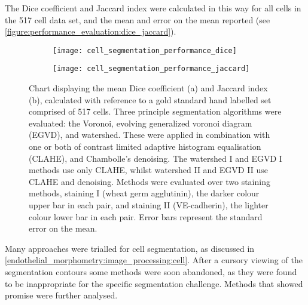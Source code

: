 The Dice coefficient and Jaccard index were calculated in this way for all cells in the 517 cell data set, and the mean and error on the mean reported (see \autoref{figure:performance_evaluation:dice_jaccard}).
\begin{figure}[htbp!]
	\begin{subfigure}[b]{\linewidth}
		\centering
		\texttt{[image: cell\_segmentation\_performance\_dice]}
		\caption{}
		\label{figure:performance_evaluation:dice_jaccard:dice}
		\vspace{1ex}
	\end{subfigure}
	\begin{subfigure}[b]{\linewidth}
		\centering
		\texttt{[image: cell\_segmentation\_performance\_jaccard]}
		\caption{}
		\label{figure:performance_evaluation:dice_jaccard:jaccard}
		\vspace{1ex}
	\end{subfigure}
\caption[Cell segmentation overlap ratio measures - Dice and Jaccard]{Chart displaying the mean Dice coefficient (a) and Jaccard index (b), calculated with reference to a gold standard hand labelled set comprised of 517 cells. Three principle segmentation algorithms were evaluated: the Voronoi, evolving generalized voronoi diagram (EGVD), and watershed. These were applied in combination with one or both of contrast limited adaptive histogram equalisation (CLAHE), and Chambolle's denoising. The watershed I and EGVD I methods use only CLAHE, whilst watershed II and EGVD II use CLAHE and denoising. Methods were evaluated over two staining methods, staining I (wheat germ agglutinin), the darker colour upper bar in each pair, and staining II (VE-cadherin), the lighter colour lower bar in each pair. Error bars represent the standard error on the mean.}
\label{figure:performance_evaluation:dice_jaccard}
\end{figure}

Many approaches were trialled for cell segmentation, as discussed in \autoref{endothelial_morphometry:image_processing:cell}. After a cursory viewing of the segmentation contours some methods were soon abandoned, as they were found to be inappropriate for the specific segmentation challenge. Methods that showed promise were further analysed.

